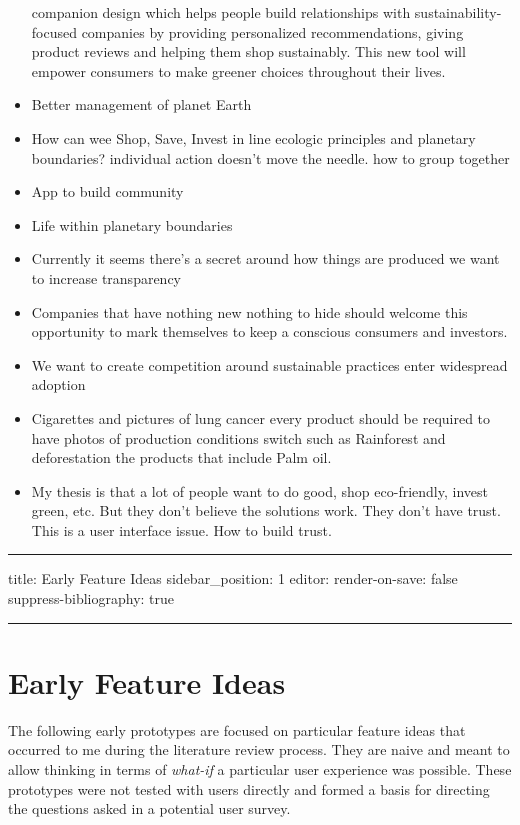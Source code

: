 \documentclass[
  letterpaper,
  DIV=11,
  numbers=noendperiod]{scrartcl}
\begin{document}
\begin{itemize}
  companion design which helps people build relationships with
  sustainability-focused companies by providing personalized
  recommendations, giving product reviews and helping them shop
  sustainably. This new tool will empower consumers to make greener
  choices throughout their lives.
\item
  Better management of planet Earth
\item
  How can wee Shop, Save, Invest in line ecologic principles and
  planetary boundaries? individual action doesn't move the needle. how
  to group together
\item
  App to build community
\item
  Life within planetary boundaries
\item
  Currently it seems there's a secret around how things are produced we
  want to increase transparency
\item
  Companies that have nothing new nothing to hide should welcome this
  opportunity to mark themselves to keep a conscious consumers and
  investors.
\item
  We want to create competition around sustainable practices enter
  widespread adoption
\item
  Cigarettes and pictures of lung cancer every product should be
  required to have photos of production conditions switch such as
  Rainforest and deforestation the products that include Palm oil.
\item
  My thesis is that a lot of people want to do good, shop eco-friendly,
  invest green, etc. But they don't believe the solutions work. They
  don't have trust. This is a user interface issue. How to build trust.
\end{itemize}

\begin{center}\rule{0.5\linewidth}{0.5pt}\end{center}

title: Early Feature Ideas sidebar\_position: 1 editor: render-on-save:
false suppress-bibliography: true

\begin{center}\rule{0.5\linewidth}{0.5pt}\end{center}

\section{Early Feature Ideas}\label{early-feature-ideas}

The following early prototypes are focused on particular feature ideas
that occurred to me during the literature review process. They are naive
and meant to allow thinking in terms of \emph{what-if} a particular user
experience was possible. These prototypes were not tested with users
directly and formed a basis for directing the questions asked in a
potential user survey.
\end{document}
